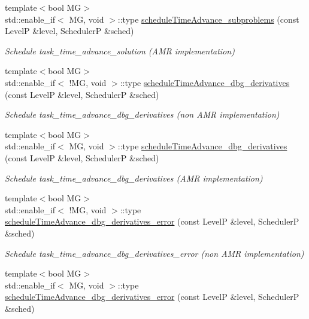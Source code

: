 \begin{DoxyCompactItemize}
{\footnotesize template$<$bool MG$>$ }\\std\+::enable\+\_\+if$<$ MG, void $>$\+::type \hyperlink{classUintah_1_1PhaseField_1_1Heat_a7daf1da9106d539e50121297c5ecf0b3}{schedule\+Time\+Advance\+\_\+subproblems} (const LevelP \&level, SchedulerP \&sched)
\begin{DoxyCompactList}\small\item\em Schedule task\+\_\+time\+\_\+advance\+\_\+solution (A\+MR implementation) \end{DoxyCompactList}\item 
{\footnotesize template$<$bool MG$>$ }\\std\+::enable\+\_\+if$<$ !MG, void $>$\+::type \hyperlink{classUintah_1_1PhaseField_1_1Heat_a4050259130c6c4b8fa97ec69cd646067}{schedule\+Time\+Advance\+\_\+dbg\+\_\+derivatives} (const LevelP \&level, SchedulerP \&sched)
\begin{DoxyCompactList}\small\item\em Schedule task\+\_\+time\+\_\+advance\+\_\+dbg\+\_\+derivatives (non A\+MR implementation) \end{DoxyCompactList}\item 
{\footnotesize template$<$bool MG$>$ }\\std\+::enable\+\_\+if$<$ MG, void $>$\+::type \hyperlink{classUintah_1_1PhaseField_1_1Heat_a4050259130c6c4b8fa97ec69cd646067}{schedule\+Time\+Advance\+\_\+dbg\+\_\+derivatives} (const LevelP \&level, SchedulerP \&sched)
\begin{DoxyCompactList}\small\item\em Schedule task\+\_\+time\+\_\+advance\+\_\+dbg\+\_\+derivatives (A\+MR implementation) \end{DoxyCompactList}\item 
{\footnotesize template$<$bool MG$>$ }\\std\+::enable\+\_\+if$<$ !MG, void $>$\+::type \hyperlink{classUintah_1_1PhaseField_1_1Heat_acc85b548081a60269deee446d0fb0f4b}{schedule\+Time\+Advance\+\_\+dbg\+\_\+derivatives\+\_\+error} (const LevelP \&level, SchedulerP \&sched)
\begin{DoxyCompactList}\small\item\em Schedule task\+\_\+time\+\_\+advance\+\_\+dbg\+\_\+derivatives\+\_\+error (non A\+MR implementation) \end{DoxyCompactList}\item 
{\footnotesize template$<$bool MG$>$ }\\std\+::enable\+\_\+if$<$ MG, void $>$\+::type \hyperlink{classUintah_1_1PhaseField_1_1Heat_acc85b548081a60269deee446d0fb0f4b}{schedule\+Time\+Advance\+\_\+dbg\+\_\+derivatives\+\_\+error} (const LevelP \&level, SchedulerP \&sched)

\end{DoxyCompactItemize}
